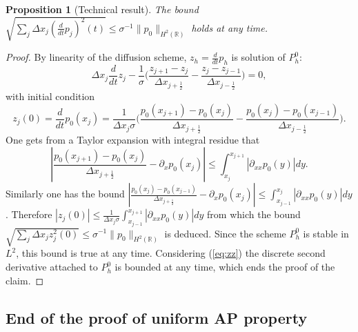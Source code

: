 \documentclass[a4paper,french,english,10pt]{article}
\newtheorem{proposition}[theorem]{Proposition}
\begin{document}
\begin{proposition}[Technical result]\label{pro:H1} 
The bound $
\sqrt{ \sum_j \Delta x_j (\frac{d}{dt}p_j)^2(t) }
\leq \sigma^{-1}\|p_0\|_{H^2(\mathbb{R})}$
 holds at any time.
 \end{proposition}

\begin{proof}

By linearity of the diffusion scheme, $z_h=\frac{d}{dt} p_h$ is solution of
$P_h^0$:
$$
\Delta x_j\frac{d}{dt} z_j -\frac{1}{\sigma } \bigg(
\frac{z_{j+1}-z_j}{\Delta x_{j+\frac12 }}-\frac{z_j -z_{j-1}}{\Delta
x_{j-\frac12 }}\bigg)=0,
$$
with initial condition
\begin{equation}\label{eq:zz}
z_j(0)=\frac{d}{dt} p_0(x_j)=
\frac1 {\Delta x_j \sigma } \bigg(
\frac{p_0(x_{j+1})-p_0(x_j)}{\Delta x_{j+\frac12 }}-\frac{p_0(x_j)
 -p_0(x_{j-1}  )}{\Delta
x_{j-\frac12 }}\bigg).
\end{equation}
One gets from a Taylor expansion with integral residue
that
$$
\left|
\frac{p_0( x_{j+1}) -p_0(x_j)}{\Delta x_{j+\frac12 }}- 
\partial_x p _0(x_j)
\right|\leq 
 \int_{x_j}^{x_{j+1}  } \left|\partial_{xx}p_0(y)   \right| dy .$$ 
Similarly one has the bound
$
\left|
 \frac{p_0( x_{j}) -p_0(x_{j-1})}{\Delta x_{j+\frac12 }}-
\partial_x p _0(x_j)\right|
\leq
 \int_{x_{j-1}}^{x_{j}  } \left|\partial_{xx}p_0(y)   \right| dy $.
Therefore $|z_j(0)|\leq
\frac1 {\Delta x_j \sigma }  \int_{x_{j-1}}^{x_{j+1}  } \left|\partial_{xx}p_0(y)  
 \right| dy $ from which the bound
$
\sqrt{ \sum_j \Delta x_j z_j^2(0) }
\leq \sigma^{-1}\|p_0\|_{H^2(\mathbb{R})}$
is deduced.
Since the scheme $P_h^0$ is stable in $L^2$, this bound is true at any time.
Considering (\ref{eq:zz}) the discrete second derivative
attached to $P_h^0$ is bounded at any time, which ends the proof
of the claim.
\end{proof} 

\subsection{End of the proof of uniform AP property}
\end{document}
